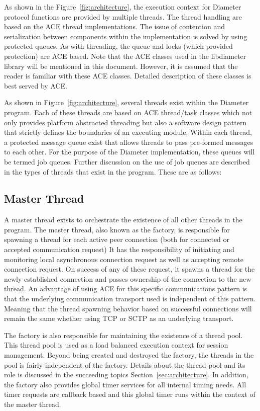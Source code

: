 \documentclass{article}
\begin{document}
As shown in the Figure~\ref{fig:architecture}, the execution context for
Diameter protocol functions are provided by multiple threads. The thread
handling are based on the ACE thread implementations. The issue of
contention and serialization between components within the
implementation is solved by using protected queues. As with threading,
the queue and locks (which provided protection) are ACE based. Note that
the ACE classes used in the libdiameter library will be mentioned in
this document. However, it is assumed that the reader is familiar with
these ACE classes. Detailed description of these classes is best served
by ACE\cite{ace}.

As shown in Figure~\ref{fig:architecture}, several threads exist within
the Diameter program.  Each of these threads are based on ACE
thread/task classes which not only provides platform abstracted
threading but also a software design pattern that strictly defines the
boundaries of an executing module. Within each thread, a protected
message queue exist that allows threads to pass pre-formed messages to
each other. For the purpose of the Diameter implementation, these queues
will be termed job queues. Further discussion on the use of job queues
are described in the types of threads that exist in the program. These
are as follows:

\subsection{Master Thread\label{sec:mastert}}

A master thread exists to orchestrate the existence of all other threads
in the program. The master thread, also known as the factory, is
responsible for spawning a thread for each active peer connection (both
for connected or accepted communication request) It has the
responsibility of initiating and monitoring local asynchronous
connection request as well as accepting remote connection request. On
success of any of these request, it spawns a thread for the newly
established connection and passes ownership of the connection to the new
thread. An advantage of using ACE for this specific communications
pattern is that the underlying communication transport used is
independent of this pattern. Meaning that the thread spawning behavior
based on successful connections will remain the same whether using TCP
or SCTP as an underlying transport.

The factory is also responsible for maintaining the existence of a
thread pool. This thread pool is used as a load balanced execution
context for session management. Beyond being created and destroyed the
factory, the threads in the pool is fairly independent of the
factory. Details about the thread pool and its role is discussed in the
succeeding topics Section~\ref{sec:architecture}. In addition, the
factory also provides global timer services for all internal timing
needs.  All timer requests are callback based and this global timer runs
within the context of the master thread.
\end{document}

